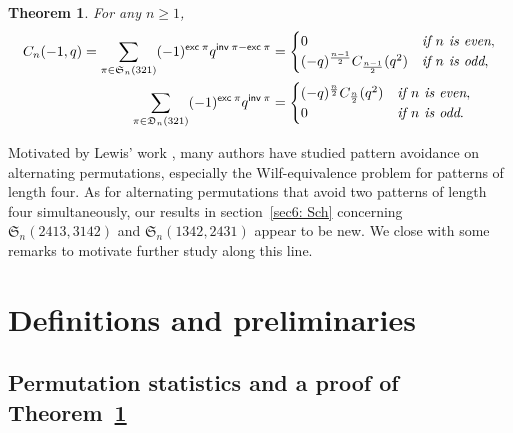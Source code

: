 \documentclass[12pt,reqno]{amsart}
\numberwithin{equation}{section}
\theoremstyle{plain}
\newtheorem{theorem}{Theorem}[section]
\theoremstyle{definition}
\def\S{\mathfrak{S}}
\def\D{\mathfrak{D}}
\def\exc{\mathsf{exc}}
\def\inv{\mathsf{inv}}
\begin{document}
\begin{theorem}\label{q-nara}
For any $n\ge 1$,
\begin{align}
\label{q-nara-odd}
C_n(-1,q)=\sum_{\pi\in\S_n(321)}(-1)^{\exc\:\pi}q^{\inv\:\pi-\exc\:\pi}&=\begin{cases}0 & \emph{if $n$ is even},\\
(-q)^{\frac{n-1}{2}}C_{\frac{n-1}{2}}(q^2) & \emph{if $n$ is odd},
\end{cases}\\
\label{q-nara-even}
\sum\limits_{\pi\in\D_n(321)}(-1)^{\exc\:\pi}q^{\inv\:\pi}
&=\begin{cases}(-q)^{\frac{n}{2}}C_{\frac{n}{2}}(q^2) & \emph{if $n$ is even},\\
0 & \emph{if $n$ is odd}.
\end{cases}
\end{align}
\end{theorem}

Motivated by Lewis' work \cite{Lew,Lew1,Lew2,Lew3}, many authors \cite{Bon,CCZ,Yan,XY,MW} have studied pattern avoidance on alternating permutations, especially the Wilf-equivalence problem for patterns of length four. As for alternating permutations that avoid two patterns of length four simultaneously, our results in section~\ref{sec6: Sch} concerning $\S_n(2413,3142)$ and $\S_n(1342,2431)$ appear to be new. We close with some remarks to motivate further study along this line.



\section{Definitions and preliminaries}\label{sec2: Pre}

\subsection{Permutation statistics and a proof of Theorem~\ref{q-nara}}
\end{document}
